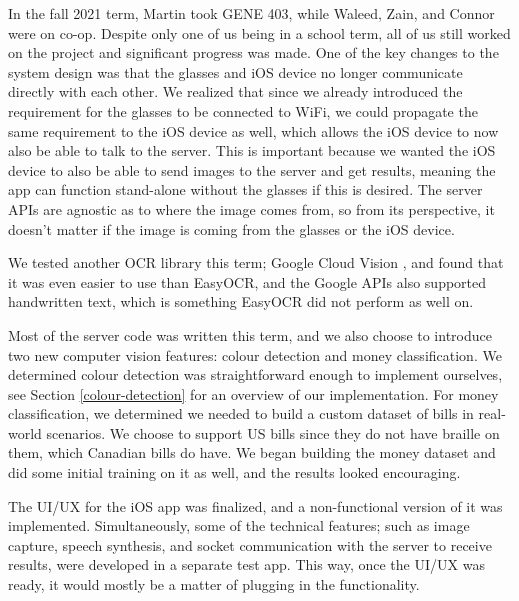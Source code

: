 \documentclass[a4paper,11pt]{article}
\begin{document}
In the fall 2021 term, Martin took GENE 403, while Waleed, Zain, and Connor were on co-op. Despite only one of us being in a school term, all of us still worked on the project and significant progress was made. One of the key changes to the system design was that the glasses and iOS device no longer communicate directly with each other. We realized that since we already introduced the requirement for the glasses to be connected to WiFi, we could propagate the same requirement to the iOS device as well, which allows the iOS device to now also be able to talk to the server. This is important because we wanted the iOS device to also be able to send images to the server and get results, meaning the app can function stand-alone without the glasses if this is desired. The server APIs are agnostic as to where the image comes from, so from its perspective, it doesn't matter if the image is coming from the glasses or the iOS device.

We tested another OCR library this term; Google Cloud Vision \cite{google-vision-api}, and found that it was even easier to use than EasyOCR, and the Google APIs also supported handwritten text, which is something EasyOCR did not perform as well on.

Most of the server code was written this term, and we also choose to introduce two new computer vision features: colour detection and money classification. We determined colour detection was straightforward enough to implement ourselves, see Section \ref{colour-detection} for an overview of our implementation. For money classification, we determined we needed to build a custom dataset of bills in real-world scenarios. We choose to support US bills since they do not have braille on them, which Canadian bills do have. We began building the money dataset and did some initial training on it as well, and the results looked encouraging.

The UI/UX for the iOS app was finalized, and a non-functional version of it was implemented. Simultaneously, some of the technical features; such as image capture, speech synthesis, and socket communication with the server to receive results, were developed in a separate test app. This way, once the UI/UX was ready, it would mostly be a matter of plugging in the functionality.
\end{document}
